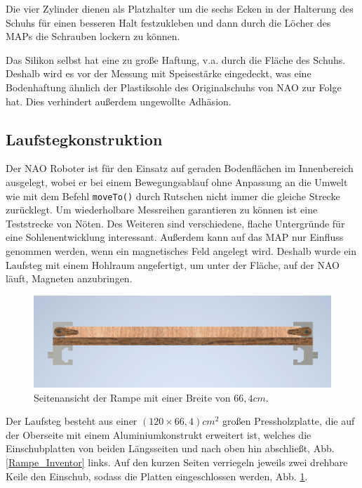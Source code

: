 Die vier Zylinder dienen als Platzhalter um die sechs Ecken in der Halterung des Schuhs für einen besseren Halt festzukleben und dann durch die Löcher des MAPs die Schrauben lockern zu können. 

Das Silikon selbst hat eine zu große Haftung, v.a. durch die Fläche des Schuhs. Deshalb wird es vor der Messung mit Speisestärke eingedeckt, was eine Bodenhaftung ähnlich der Plastiksohle des Originalschuhs von NAO zur Folge hat. Dies verhindert außerdem ungewollte Adhäsion.

\subsection{Laufstegkonstruktion} \FloatBarrier

Der NAO Roboter ist für den Einsatz auf geraden Bodenflächen im Innenbereich ausgelegt, wobei er bei einem Bewegungsablauf ohne Anpassung an die Umwelt wie mit dem Befehl \texttt{moveTo()} durch Rutschen nicht immer die gleiche Strecke zurücklegt. 
Um wiederholbare Messreihen garantieren zu können ist eine Teststrecke von Nöten. Des Weiteren sind verschiedene, flache Untergründe für eine Sohlenentwicklung interessant.
Außerdem kann auf das MAP nur Einfluss genommen werden, wenn ein magnetisches Feld angelegt wird. Deshalb wurde ein Laufsteg mit einem Hohlraum angefertigt, um unter der Fläche, auf der NAO läuft, Magneten anzubringen. 

\begin{figure}
	\vspace{-0.5cm}
	\centering
	\includegraphics[width=\linewidth]{Bilder/Rampe_Seitenansicht3.png}
	\caption{Seitenansicht der Rampe mit einer Breite von $66,4 \unit{cm}$.}
	\label{Rampe_Seite_Inventor}
	\vspace{-0.5cm}
\end{figure}

Der Laufsteg besteht aus einer $(120\times66,4) \unit{cm^2}$ großen Pressholzplatte, die auf der Oberseite mit einem Aluminiumkonstrukt erweitert ist, welches die Einschubplatten von beiden Längsseiten und nach oben hin abschließt, Abb. \ref{Rampe_Inventor} links. Auf den kurzen Seiten verriegeln jeweils zwei drehbare Keile den Einschub, sodass die Platten eingeschlossen werden, Abb. \ref{Rampe_Seite_Inventor}.

